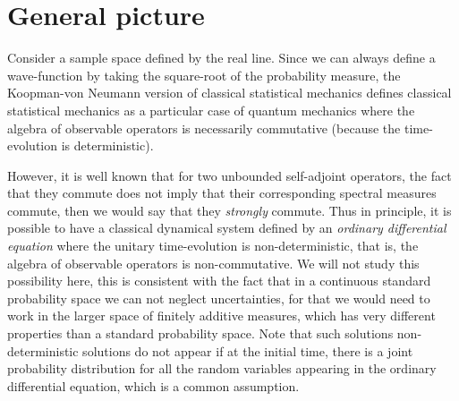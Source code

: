 \documentclass[11pt]{book}
\begin{document}
\hypertarget{general-picture}{%
\section{\texorpdfstring{\textbf{General picture}
}{General picture }}\label{general-picture}}

Consider a sample space defined by the real line. Since we can always
define a wave-function by taking the square-root of the probability
measure, the Koopman-von Neumann version of classical statistical
mechanics\cite{Sudarshan1976Interaction}\cite{PhysRevResearch.2.043102}\cite{article}\cite{BEVANDA2021197}
defines classical statistical mechanics as a particular case of quantum
mechanics where the algebra of observable operators is necessarily
commutative (because the time-evolution is deterministic).

However, it is well known that for two unbounded self-adjoint operators,
the fact that they commute does not imply that their corresponding
spectral measures
commute\cite{schmuxfcdgen2012unbounded}, then we would say that they \emph{strongly} commute. Thus in
principle, it is possible to have a classical dynamical system defined
by an \emph{ordinary differential equation} where the unitary
time-evolution is non-deterministic, that is, the algebra of observable
operators is non-commutative. We will not study this possibility here,
this is consistent with the fact that in a continuous standard
probability space we can not neglect uncertainties, for that we would
need to work in the larger space of finitely additive
measures\cite{book}, which has very
different properties than a standard probability space. Note that such
solutions non-deterministic solutions do not appear if at the initial
time, there is a joint probability distribution for all the random
variables appearing in the ordinary differential equation, which is a
common assumption.
\end{document}
